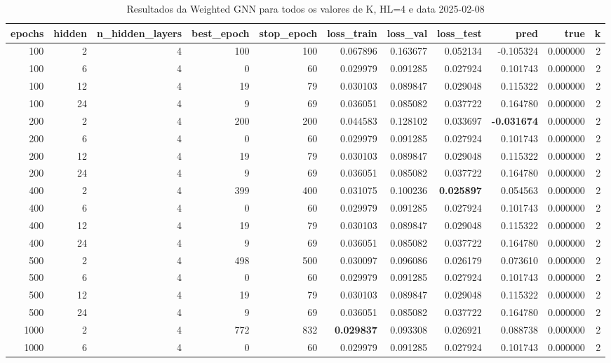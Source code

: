 \begin{table}
\caption{Resultados da Weighted GNN para todos os valores de K, HL=4 e data 2025-02-08}
\label{tab:weighted_gnn_results_allk_hl4_d20250208}
\begin{tabular}{rrrrrrrrrrr}
\toprule
epochs & hidden & n\_hidden\_layers & best\_epoch & stop\_epoch & loss\_train & loss\_val & loss\_test & pred & true & k \\
\midrule
100 & 2 & 4 & 100 & 100 & 0.067896 & 0.163677 & 0.052134 & -0.105324 & 0.000000 & 2 \\
100 & 6 & 4 & 0 & 60 & 0.029979 & 0.091285 & 0.027924 & 0.101743 & 0.000000 & 2 \\
100 & 12 & 4 & 19 & 79 & 0.030103 & 0.089847 & 0.029048 & 0.115322 & 0.000000 & 2 \\
100 & 24 & 4 & 9 & 69 & 0.036051 & 0.085082 & 0.037722 & 0.164780 & 0.000000 & 2 \\
200 & 2 & 4 & 200 & 200 & 0.044583 & 0.128102 & 0.033697 & \textbf{-0.031674} & 0.000000 & 2 \\
200 & 6 & 4 & 0 & 60 & 0.029979 & 0.091285 & 0.027924 & 0.101743 & 0.000000 & 2 \\
200 & 12 & 4 & 19 & 79 & 0.030103 & 0.089847 & 0.029048 & 0.115322 & 0.000000 & 2 \\
200 & 24 & 4 & 9 & 69 & 0.036051 & 0.085082 & 0.037722 & 0.164780 & 0.000000 & 2 \\
400 & 2 & 4 & 399 & 400 & 0.031075 & 0.100236 & \textbf{0.025897} & 0.054563 & 0.000000 & 2 \\
400 & 6 & 4 & 0 & 60 & 0.029979 & 0.091285 & 0.027924 & 0.101743 & 0.000000 & 2 \\
400 & 12 & 4 & 19 & 79 & 0.030103 & 0.089847 & 0.029048 & 0.115322 & 0.000000 & 2 \\
400 & 24 & 4 & 9 & 69 & 0.036051 & 0.085082 & 0.037722 & 0.164780 & 0.000000 & 2 \\
500 & 2 & 4 & 498 & 500 & 0.030097 & 0.096086 & 0.026179 & 0.073610 & 0.000000 & 2 \\
500 & 6 & 4 & 0 & 60 & 0.029979 & 0.091285 & 0.027924 & 0.101743 & 0.000000 & 2 \\
500 & 12 & 4 & 19 & 79 & 0.030103 & 0.089847 & 0.029048 & 0.115322 & 0.000000 & 2 \\
500 & 24 & 4 & 9 & 69 & 0.036051 & 0.085082 & 0.037722 & 0.164780 & 0.000000 & 2 \\
1000 & 2 & 4 & 772 & 832 & \textbf{0.029837} & 0.093308 & 0.026921 & 0.088738 & 0.000000 & 2 \\
1000 & 6 & 4 & 0 & 60 & 0.029979 & 0.091285 & 0.027924 & 0.101743 & 0.000000 & 2 \\

\end{tabular}
\end{table}
